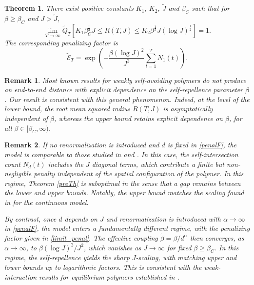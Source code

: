 \documentclass[12pt]{amsart}
\newtheorem{theorem}{Theorem}[section]
\newtheorem{remark}{Remark}[section]
\numberwithin{equation}{section}
\newcommand{\1}{\mathbf{1}}
\begin{document}
\begin{theorem}
\label{mainTh}
    There exist positive constants $K_1$, $K_2$, $\tilde{J}$ and $\beta_C$ such that for $\beta\geq\beta_C$ and $J>\tilde{J}$,
    \begin{equation*}
        \lim_{T\to\infty}\widetilde{Q}_T\left[K_1\beta_C^{\frac{1}{3}}J\leq R(T,J)\leq K_2\beta^{\frac{1}{3}}J(\log J)^{\frac{1}{2}}\right]=1.
    \end{equation*}
    The corresponding penalizing factor is
    \begin{equation}
    \label{limit_penal}
        \widetilde{\mathcal{E}}_T=\exp\left(-\frac{\beta(\log J)^2}{J^2}\sum_{t=1}^TN_1(t)\right).
    \end{equation}
\end{theorem}

\begin{remark}
Most known results for weakly self-avoiding polymers do not produce an end-to-end distance with explicit dependence on the self-repellence parameter $\beta$. Our result is consistent with this general phenomenon. Indeed, at the level of the lower bound, the root mean squared radius $R(T,J)$ is asymptotically independent of $\beta$, whereas the upper bound retains explicit dependence on $\beta$, for all $\beta\in[\beta_C,\infty)$. 
\end{remark}

\begin{remark}
If no renormalization is introduced and $d$ is fixed in \eqref{penalF}, the model is comparable to those studied in \cite{lin2025radius} and \cite{mueller2022scaling}. In this case, the self-intersection count $N_d(t)$ includes the $J$ diagonal terms, which contribute a finite but non-negligible penalty independent of the spatial configuration of the polymer. In this regime, Theorem \ref{preTh} is suboptimal in the sense that a gap remains between the lower and upper bounds. Notably, the upper bound matches the scaling found in \cite{mueller2022scaling} for the continuous model.

By contrast, once $d$ depends on $J$ and renormalization is introduced with $\alpha \to \infty$ in \eqref{penalF}, the model enters a fundamentally different regime, with the penalizing factor given in \eqref{limit_penal}. The effective coupling $\tilde{\beta}=\beta/d^\alpha$ then converges, as $\alpha\to\infty$, to $\beta(\log J)^2/J^2$, which vanishes as $J \to \infty$ for fixed $\beta\geq\beta_C$. In this regime, the self-repellence yields the sharp $J$-scaling, with matching upper and lower bounds up to logarithmic factors. This is consistent with the weak-interaction results for equilibrium polymers established in \cite{hofstad2003weak}.
\end{remark}
\end{document}
